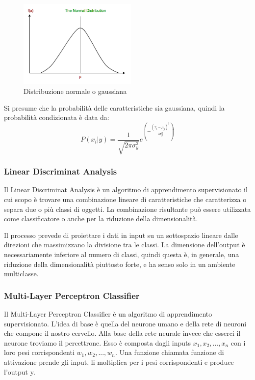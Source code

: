 \documentclass[12pt,italian]{report}
\begin{document}
\begin{figure}[h]
	\centering
	\includegraphics[width = 58mm]{immagini/naive-bayes-classification-1}
	\caption{Distribuzione normale o gaussiana}
\end{figure}

Si presume che la probabilità delle caratteristiche sia gaussiana, quindi la probabilità condizionata è data da:
\begin{equation}
P(x_i|y) = \frac{1}{\sqrt{2\pi \sigma_y^2}} e^{(-\frac{(x_i-\mu_y)^2}{2\sigma_y^2})}
\end{equation}

\subsubsection{Linear Discriminat Analysis}
Il Linear Discriminat Analysis è un algoritmo di apprendimento supervisionato il cui scopo è trovare una combinazione lineare di caratteristiche che caratterizza o separa due o più classi di oggetti. La combinazione risultante può essere utilizzata come classificatore o anche per la riduzione della dimensionalità.

Il processo prevede di proiettare i dati in input su un sottospazio lineare dalle direzioni che massimizzano la divisione tra le classi. La dimensione dell'output è necessariamente inferiore al numero di classi, quindi questa è, in generale, una riduzione della dimensionalità piuttosto forte, e ha senso solo in un ambiente multiclasse.

\subsubsection{Multi-Layer Perceptron Classifier}
Il Multi-Layer Perceptron Classifier è un algoritmo di apprendimento supervisionato. L'idea di base è quella del neurone umano e della rete di neuroni che compone il nostro cervello. Alla base della rete neurale invece che esserci il neurone troviamo il percettrone. Esso è composta dagli inputs $x_1, x_2, ..., x_n$ con i loro pesi corrispondenti $w_1, w_2, ..., w_n$. Una funzione chiamata funzione di attivazione prende gli input, li moltiplica per i pesi corrispondenti e produce l'output y.
\end{document}
